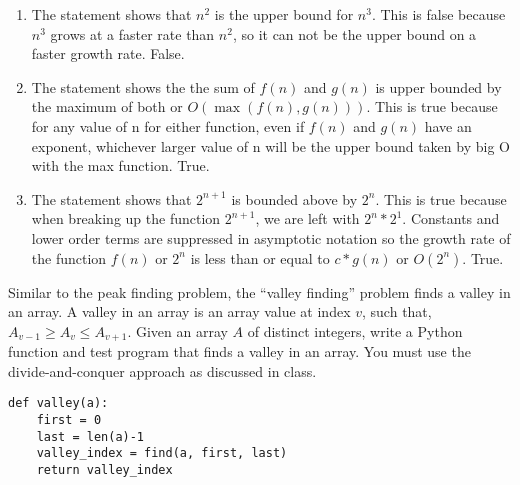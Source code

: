\documentclass[addpoints,11pt]{exam}
\begin{document}
\begin{questions}

\begin{solutionorbox}
	\begin{enumerate}[label=(\alph*)]
		\item The statement shows that $n^2$ is the upper bound for $n^3$. This is false because $n^3$ grows at a faster rate than $n^2$, so it can not be the upper bound on a faster growth rate. False.
		\item The statement shows the the sum of $f(n)$ and $g(n)$ is upper bounded by the maximum of both or $O(\max(f(n), g(n)))$. This is true because for any value of n for either function, even if $f(n)$ and $g(n)$ have an exponent, whichever larger value of n will be the upper bound taken by big O with the max function. True. 
		\item The statement shows that $2^{n+1}$ is bounded above by $2^n$. This is true because when breaking up the function $2^{n+1}$, we are left with $2^{n} * 2^{1}$. Constants and lower order terms are suppressed in asymptotic notation so the growth rate of the function $f(n)$ or $2^{n}$ is less than or equal to $c*g(n)$ or $O(2^n)$. True. 
	\end{enumerate}
\end{solutionorbox}

\newpage


\question[10]
Similar to the peak finding problem, the ``valley finding'' problem finds a valley in an array.  A valley in an array is an array value at index $v$, such that, $A_{v-1} \ge A_v \le A_{v+1}$.  Given an array $A$ of distinct integers, write a Python function and test program that finds a valley in an array.  You must use the divide-and-conquer approach as discussed in class.
\begin{solutionorbox}
\begin{verbatim}
def valley(a):
    first = 0
    last = len(a)-1
    valley_index = find(a, first, last)
    return valley_index


\end{verbatim}
\end{solutionorbox}
\end{questions}
\end{document}
